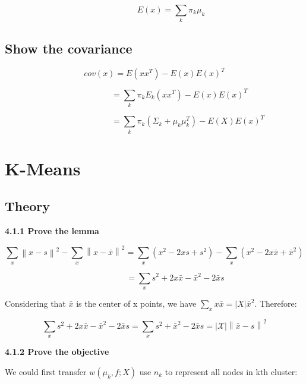 \documentclass{article} %
\newcommand{\norm}[1]{\left\lVert #1 \right\rVert}
\newcommand{\abs}[1]{\left\lvert #1 \right\rvert}
\begin{document}
\begin{equation}
\qquad \qquad
E (x) = \sum_k \pi_k \mu_k
\end{equation}


\subsection{Show the covariance}
\begin{equation}
cov (x) = E (x x^T) - E (x) E(x)^T
\end{equation}

\begin{equation}
\qquad \qquad \qquad
= \sum_k \pi_k E_k (x x^T) - E (x) E(x)^T
\end{equation}

\begin{equation}
\qquad \qquad \qquad \qquad
= \sum_k \pi_k (\Sigma_k + \mu_k \mu_k^T) - E (X) E (x)^T
\end{equation}



\section{K-Means}


\subsection{Theory}

\textbf{4.1.1 Prove the lemma}

\begin{equation}
\sum_x \norm{x - s}^2 - \sum_x \norm{x - \bar{x}}^2 =
\sum_x (x^2 -2xs + s^2) - \sum_x (x^2 -2x \bar{x} + \bar{x}^2)
\end{equation}

\begin{equation}
\qquad \qquad \quad
= \sum_x s^2 +2 x \bar{x} - \bar{x}^2 -2\bar{x}s
\end{equation}

Considering that $\bar{x}$ is the center of x points, we have $\sum_x
x\bar{x} = \abs{X} \bar{x}^2$. Therefore:

\begin{equation}
\sum_x s^2 +2 x \bar{x} - \bar{x}^2 -2\bar{x}s
= \sum_x s^2 + \bar{x}^2 - 2 \bar{x} s
= \abs{\mathcal{X}} \norm{\bar{x} - s}^2
\end{equation}

\textbf{4.1.2 Prove the objective}

We could first transfer $w (\mu_k, f; X)$ use $n_k$ to represent all nodes in
kth cluster:
\end{document}
